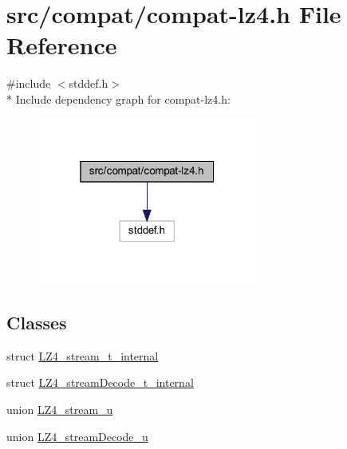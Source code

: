 \hypertarget{compat-lz4_8h}{}\section{src/compat/compat-\/lz4.h File Reference}
\label{compat-lz4_8h}
{\ttfamily \#include $<$stddef.\+h$>$}\\*
Include dependency graph for compat-\/lz4.h\+:
\nopagebreak
\begin{figure}[H]
\begin{center}
\leavevmode
\includegraphics[width=205pt]{compat-lz4_8h__incl}
\end{center}
\end{figure}
\subsection*{Classes}
\begin{DoxyCompactItemize}
\item 
struct \hyperlink{struct_l_z4__stream__t__internal}{L\+Z4\+\_\+stream\+\_\+t\+\_\+internal}
\item 
struct \hyperlink{struct_l_z4__stream_decode__t__internal}{L\+Z4\+\_\+stream\+Decode\+\_\+t\+\_\+internal}
\item 
union \hyperlink{union_l_z4__stream__u}{L\+Z4\+\_\+stream\+\_\+u}
\item 
union \hyperlink{union_l_z4__stream_decode__u}{L\+Z4\+\_\+stream\+Decode\+\_\+u}
\end{DoxyCompactItemize}
